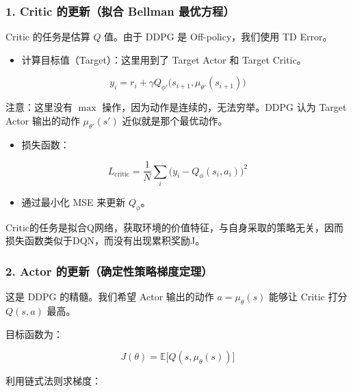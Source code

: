 \hypertarget{critic-ux7684ux66f4ux65b0ux62dfux5408-bellman-ux6700ux4f18ux65b9ux7a0b}{%
\subsubsection{1. Critic 的更新（拟合 Bellman 最优方程）}\label{critic-ux7684ux66f4ux65b0ux62dfux5408-bellman-ux6700ux4f18ux65b9ux7a0b}}

Critic 的任务是估算 \(Q\) 值。由于 DDPG 是 Off-policy，我们使用 TD Error。

\begin{itemize}
\tightlist
\item
  计算目标值（Target）：这里用到了 Target Actor 和 Target Critic。
\end{itemize}

\[
y_i
=
r_i
+
\gamma Q_{\phi'}\bigl(
s_{i+1},
\mu_{\theta'}(s_{i+1})
\bigr)
\]

注意：这里没有 \(\max\) 操作，因为动作是连续的，无法穷举。DDPG 认为 Target Actor 输出的动作 \(\mu_{\theta'}(s')\) 近似就是那个最优动作。

\begin{itemize}
\tightlist
\item
  损失函数：
\end{itemize}

\[
L_{\mathrm{critic}}
=
\frac{1}{N}
\sum_i
\bigl(
y_i-Q_\phi(s_i,a_i)
\bigr)^{2}
\]

\begin{itemize}
\tightlist
\item
  通过最小化 MSE 来更新 \(Q_\phi\)。
\end{itemize}

Critic的任务是拟合Q网络，获取环境的价值特征，与自身采取的策略无关，因而损失函数类似于DQN，而没有出现累积奖励J。

\hypertarget{actor-ux7684ux66f4ux65b0ux786eux5b9aux6027ux7b56ux7565ux68afux5ea6ux5b9aux7406}{%
\subsubsection{2. Actor 的更新（确定性策略梯度定理）}\label{actor-ux7684ux66f4ux65b0ux786eux5b9aux6027ux7b56ux7565ux68afux5ea6ux5b9aux7406}}

这是 DDPG 的精髓。我们希望 Actor 输出的动作 \(a=\mu_\theta(s)\) 能够让 Critic 打分 \(Q(s,a)\) 最高。

目标函数为：

\[
J(\theta)
=
\mathbb{E}\bigl[
Q(s,\mu_\theta(s))
\bigr]
\]

利用链式法则求梯度：

